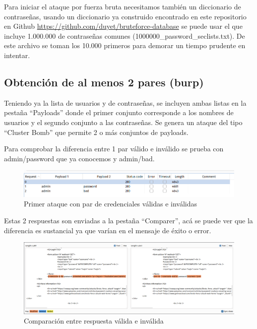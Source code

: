 \documentclass[letter,12pt]{article}
\begin{document}
Para iniciar el ataque por fuerza bruta necesitamos también un diccionario de
contraseñas, usando un diccionario ya construido encontrado en este repositorio
en Github \href{duyet/bruteforce-database}{https://github.com/duyet/bruteforce-database}
se puede usar el que incluye 1.000.000 de contraseñas comunes
(1000000\_password\_seclists.txt). De este archivo se toman los 10.000 primeros
para demorar un tiempo prudente en intentar.

\subsection{Obtención de al menos 2 pares (burp)}
Teniendo ya la lista de usuarios y de contraseñas, se incluyen ambas listas en
la pestaña ``Payloads'' donde el primer conjunto corresponde a los nombres de
usuarios y el segundo conjunto a las contraseñas. Se genera un ataque del tipo
``Cluster Bomb'' que permite 2 o más conjuntos de payloads.

Para comprobar la diferencia entre 1 par válido e inválido se prueba con
admin/password que ya conocemos y admin/bad.

\begin{figure}[H]
  \centering
  \includegraphics[width=16cm]{images/12-admin-success-and-invalid.png}
  \caption{Primer ataque con par de credenciales válidas e inválidas}
\end{figure}

Estas 2 respuestas son enviadas a la pestaña ``Comparer'', acá se puede ver que
la diferencia es sustancial ya que varían en el mensaje de éxito o error.

\begin{figure}[H]
  \centering
  \includegraphics[width=16cm]{images/13-admin-comparer.png}
  \caption{Comparación entre respuesta válida e inválida}
\end{figure}
\end{document}
